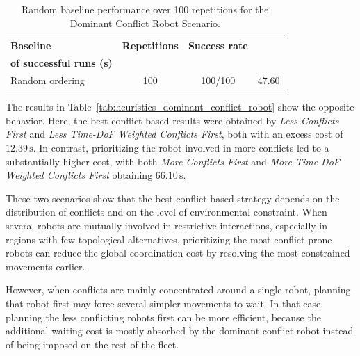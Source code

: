 \begin{table}[H]
\centering
\caption{Random baseline performance over 100 repetitions for the Dominant Conflict Robot Scenario.}
\label{tab:random_baseline_dominant_conflict_robot}
\footnotesize
\setlength{\tabcolsep}{6pt}
\begin{tabular}{@{}lccc@{}}
\toprule
\textbf{Baseline} & \textbf{Repetitions} & \textbf{Success rate} & \makecell{\textbf{Mean excess cost}\\\textbf{of successful runs (s)}} \\
\midrule
Random ordering & 100 & 100/100 & 47.60 \\
\bottomrule
\end{tabular}
\end{table}


The results in Table~\ref{tab:heuristics_dominant_conflict_robot} show the opposite behavior.
Here, the best conflict-based results were obtained by \textit{Less Conflicts First} and
\textit{Less Time-DoF Weighted Conflicts First}, both with an excess cost of \(12.39\,\mathrm{s}\). In contrast,
prioritizing the robot involved in more conflicts led to a substantially higher cost, with both
\textit{More Conflicts First} and \textit{More Time-DoF Weighted Conflicts First} obtaining
\(66.10\,\mathrm{s}\).

These two scenarios show that the best conflict-based strategy depends on the distribution of
conflicts and on the level of environmental constraint. When several robots are mutually involved
in restrictive interactions, especially in regions with few topological alternatives, prioritizing the
most conflict-prone robots can reduce the global coordination cost by resolving the most constrained
movements earlier.

However, when conflicts are mainly concentrated around a single robot, planning that robot first
may force several simpler movements to wait. In that case, planning the less conflicting robots
first can be more efficient, because the additional waiting cost is mostly absorbed by the dominant
conflict robot instead of being imposed on the rest of the fleet.

